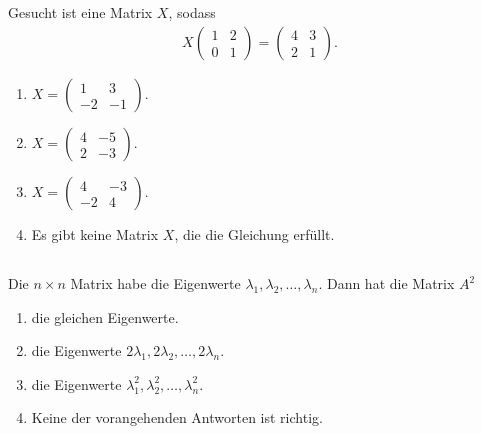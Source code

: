 \subsection*{}
Gesucht ist eine Matrix $ X $, sodass
\begin{align*}
X
\begin{pmatrix}
1 & 2 \\
0 & 1 
\end{pmatrix}
=
\begin{pmatrix}
4 & 3 \\
2 & 1
\end{pmatrix}
.
\end{align*}
\renewcommand{\labelenumi}{(\alph{enumi})}
\begin{enumerate}
\item 
$X
= 
\begin{pmatrix}
1 & 3  \\
-2 & -1 
\end{pmatrix}$.
\item
$X
= 
\begin{pmatrix}
4 &-5  \\
2 & -3 
\end{pmatrix}$.
\item
$X
= 
\begin{pmatrix}
4 &-3  \\
-2 & 4 
\end{pmatrix}$.
\item
Es gibt keine Matrix $ X $, die die Gleichung erfüllt.
\end{enumerate}

\newpage
\subsection*{}
Die $ n \times n $ Matrix habe die Eigenwerte $ \lambda_1, \lambda_2, \dots, \lambda_n $.
Dann hat die Matrix $ A^2 $
\renewcommand{\labelenumi}{(\alph{enumi})}
\begin{enumerate}
\item 
die gleichen Eigenwerte.
\item
die Eigenwerte $2 \lambda_1,2 \lambda_2, \dots,2 \lambda_n $.
\item
die Eigenwerte $ \lambda_1^2, \lambda_2^2, \dots, \lambda_n^2 $.
\item
Keine der vorangehenden Antworten ist richtig.
\end{enumerate}
\ \\
